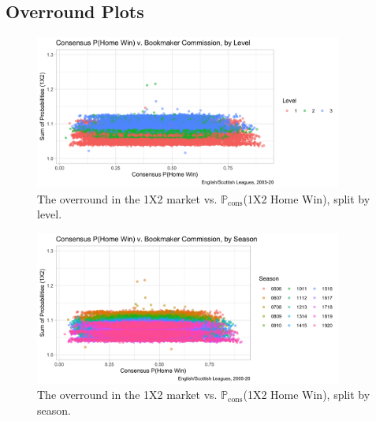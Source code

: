 \documentclass[a4paper,10pt]{report}
\begin{document}
\subsection*{Overround Plots}
\begin{figure}[h!]\begin{center}
		\includegraphics[width=0.9\textwidth]{ensco_14a_overround_ot_l.png}  
		\caption{The overround in the 1X2 market vs. $\mathbb{P}_{\textrm{cons}}$(1X2 Home Win), split by level.}\label{FIG:02_05a_overround1x2_level}
\end{center}\end{figure}
\begin{figure}[h!]\begin{center}
		\includegraphics[width=0.9\textwidth]{ensco_14b_overround_ot_s.png}  
		\caption{The overround in the 1X2 market vs. $\mathbb{P}_{\textrm{cons}}$(1X2 Home Win), split by season.}\label{FIG:02_05b_overround1x2_season}
\end{center}\end{figure} \pagebreak
\end{document}
